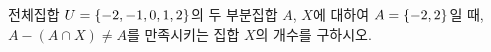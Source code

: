 전체집합 $U=\{-2{,}\mkern3mu\mathopen{}-1{,}\mkern3mu\mathopen{}0{,}\mkern3mu\mathopen{}1{,}\mkern3mu\mathopen{}2\}$의 두 부분집합 $A$, $X$에 대하여 $A=\{-2{,}\mkern3mu\mathopen{}2\}$일 때, $A-(A\cap X)\ne A$를 만족시키는 집합 $X$의 개수를 구하시오.
